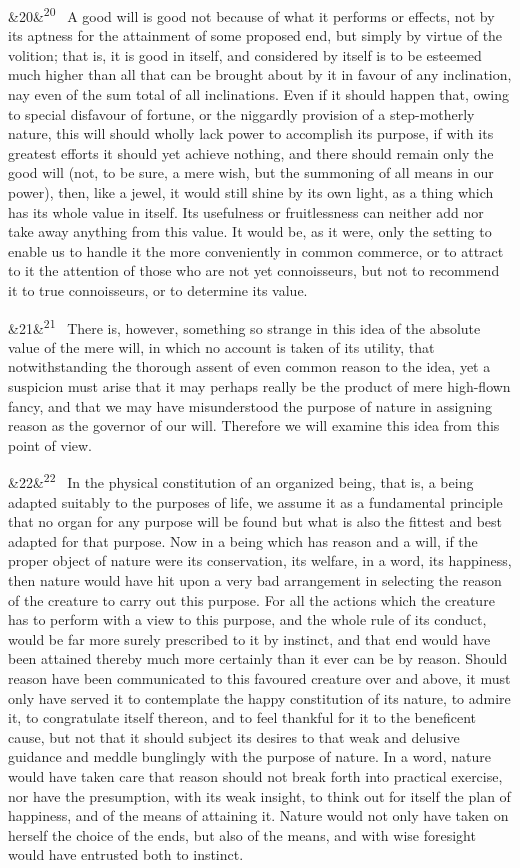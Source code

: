 \documentclass[12pt]{article}
\newcommand{\para}[1][]{\par\noindent\ifx&#1&\else\textsuperscript{\footnotesize #1}~\fi}
\begin{document}
\para[20] A good will is good not because of what it performs or effects, not by its aptness for the attainment of some proposed end, but simply by virtue of the volition; that is, it is good in itself, and considered by itself is to be esteemed much higher than all that can be brought about by it in favour of any inclination, nay even of the sum total of all inclinations. Even if it should happen that, owing to special disfavour of fortune, or the niggardly provision of a step-motherly nature, this will should wholly lack power to accomplish its purpose, if with its greatest efforts it should yet achieve nothing, and there should remain only the good will (not, to be sure, a mere wish, but the summoning of all means in our power), then, like a jewel, it would still shine by its own light, as a thing which has its whole value in itself. Its usefulness or fruitlessness can neither add nor take away anything from this value. It would be, as it were, only the setting to enable us to handle it the more conveniently in common commerce, or to attract to it the attention of those who are not yet connoisseurs, but not to recommend it to true connoisseurs, or to determine its value.

\para[21] There is, however, something so strange in this idea of the absolute value of the mere will, in which no account is taken of its utility, that notwithstanding the thorough assent of even common reason to the idea, yet a suspicion must arise that it may perhaps really be the product of mere high-flown fancy, and that we may have misunderstood the purpose of nature in assigning reason as the governor of our will. Therefore we will examine this idea from this point of view.

\para[22] In the physical constitution of an organized being, that is, a being adapted suitably to the purposes of life, we assume it as a fundamental principle that no organ for any purpose will be found but what is also the fittest and best adapted for that purpose. Now in a being which has reason and a will, if the proper object of nature were its conservation, its welfare, in a word, its happiness, then nature would have hit upon a very bad arrangement in selecting the reason of the creature to carry out this purpose. For all the actions which the creature has to perform with a view to this purpose, and the whole rule of its conduct, would be far more surely prescribed to it by instinct, and that end would have been attained thereby much more certainly than it ever can be by reason. Should reason have been communicated to this favoured creature over and above, it must only have served it to contemplate the happy constitution of its nature, to admire it, to congratulate itself thereon, and to feel thankful for it to the beneficent cause, but not that it should subject its desires to that weak and delusive guidance and meddle bunglingly with the purpose of nature. In a word, nature would have taken care that reason should not break forth into practical exercise, nor have the presumption, with its weak insight, to think out for itself the plan of happiness, and of the means of attaining it. Nature would not only have taken on herself the choice of the ends, but also of the means, and with wise foresight would have entrusted both to instinct.
\end{document}
